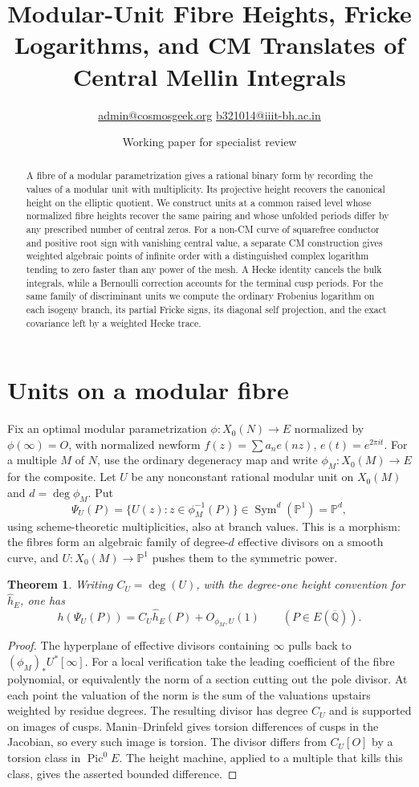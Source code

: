 \documentclass[11pt]{article}
\title{Modular-Unit Fibre Heights, Fricke Logarithms, and CM Translates of Central Mellin Integrals}
\author{\small\href{mailto:admin@cosmosgeek.org}{admin@cosmosgeek.org}\quad
\href{mailto:b321014@iiit-bh.ac.in}{b321014@iiit-bh.ac.in}}
\date{Working paper for specialist review}
\newtheorem{theorem}{Theorem}[section]\newtheorem{lemma}[theorem]{Lemma}
\newcommand{\Q}{\mathbb Q}\newcommand{\Z}{\mathbb Z}\newcommand{\R}{\mathbb R}\newcommand{\C}{\mathbb C}
\begin{document}
\maketitle
\begin{abstract}
A fibre of a modular parametrization gives a rational binary form by recording the values of a modular unit with multiplicity. Its projective height recovers the canonical height on the elliptic quotient. We construct units at a common raised level whose normalized fibre heights recover the same pairing and whose unfolded periods differ by any prescribed number of central zeros. For a non-CM curve of squarefree conductor and positive root sign with vanishing central value, a separate CM construction gives weighted algebraic points of infinite order with a distinguished complex logarithm tending to zero faster than any power of the mesh. A Hecke identity cancels the bulk integrals, while a Bernoulli correction accounts for the terminal cusp periods. For the same family of discriminant units we compute the ordinary Frobenius logarithm on each isogeny branch, its partial Fricke signs, its diagonal self projection, and the exact covariance left by a weighted Hecke trace.
\end{abstract}

\section{Units on a modular fibre}
Fix an optimal modular parametrization $\phi:X_0(N)\to E$ normalized by $\phi(\infty)=O$, with normalized newform $f(z)=\sum a_n e(nz)$, $e(t)=e^{2\pi it}$. For a multiple $M$ of $N$, use the ordinary degeneracy map and write $\phi_M:X_0(M)\to E$ for the composite. Let $U$ be any nonconstant rational modular unit on $X_0(M)$ and $d=\deg\phi_M$. Put
\[
 \Psi_U(P)=\bigl\{U(z):z\in\phi_M^{-1}(P)\bigr\}
 \in\operatorname{Sym}^d(\mathbb P^1)=\mathbb P^d,
\]
using scheme-theoretic multiplicities, also at branch values. This is a morphism: the fibres form an algebraic family of degree-$d$ effective divisors on a smooth curve, and $U:X_0(M)\to\mathbb P^1$ pushes them to the symmetric power.

\begin{theorem}
Writing $C_U=\deg(U)$, with the degree-one height convention for $\widehat h_E$, one has
\[
 h(\Psi_U(P))=C_U\widehat h_E(P)+O_{\phi_M,U}(1)
 \qquad(P\in E(\overline{\Q})).
\]
\end{theorem}
\begin{proof}
The hyperplane of effective divisors containing $\infty$ pulls back to $(\phi_M)_*U^*[\infty]$. For a local verification take the leading coefficient of the fibre polynomial, or equivalently the norm of a section cutting out the pole divisor. At each point the valuation of the norm is the sum of the valuations upstairs weighted by residue degrees. The resulting divisor has degree $C_U$ and is supported on images of cusps. Manin--Drinfeld gives torsion differences of cusps in the Jacobian, so every such image is torsion. The divisor differs from $C_U[O]$ by a torsion class in $\operatorname{Pic}^0 E$. The height machine, applied to a multiple that kills this class, gives the asserted bounded difference.
\end{proof}
\end{document}
